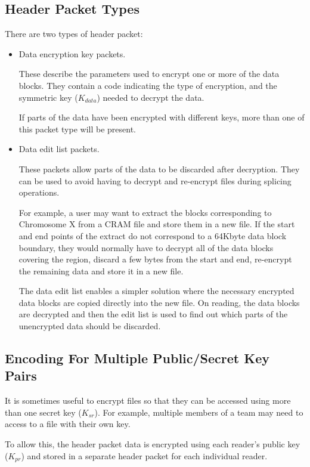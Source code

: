 \documentclass[10pt]{article}
\begin{document}
\subsection{Header Packet Types}\label{overview:header_packet_types}
There are two types of header packet:
\begin{itemize}
\item Data encryption key packets.

These describe the parameters used to encrypt one or more of the data blocks.
They contain a code indicating the type of encryption, and the symmetric key ($K_{data}$) needed to decrypt the data.

If parts of the data have been encrypted with different keys, more than one of this packet type will be present.

\item Data edit list packets.

These packets allow parts of the data to be discarded after decryption.
They can be used to avoid having to decrypt and re-encrypt files during splicing operations.

For example, a user may want to extract the blocks corresponding to Chromosome X from a CRAM file and store them
in a new file.
If the start and end points of the extract do not correspond to a 64Kbyte data block boundary, they would normally
have to decrypt all of the data blocks covering the region, discard a few bytes from the start and end, re-encrypt the
remaining data and store it in a new file.

The data edit list enables a simpler solution where the necessary encrypted data blocks are copied directly into
the new file.
On reading, the data blocks are decrypted and then the edit list is used to find out which parts of the unencrypted
data should be discarded.
\end{itemize}

\subsection{Encoding For Multiple Public/Secret Key Pairs}

It is sometimes useful to encrypt files so that they can be accessed using more than one secret key ($K_{sr}$).
For example, multiple members of a team may need to access to a file with their own key.

To allow this,
the header packet data is encrypted using each reader's public key ($K_{pr}$) and stored in a separate header packet
for each individual reader.
\end{document}
